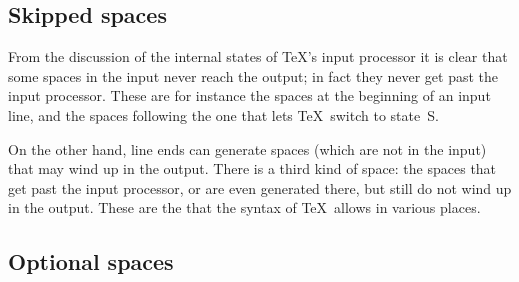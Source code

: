 \documentclass{book}
\begin{document}
\subsection{Skipped spaces}

From the discussion of the internal states of \TeX's 
input processor
it is clear that some spaces in the input never reach the
output; in fact they never get past the input processor.
These are for instance the spaces at the beginning
of an input line, and the spaces following the one
that lets \TeX\ switch to state~{\italic S}.


On the other hand, line ends can generate spaces (which are not
in the input) that may wind up in the output.
There is a third kind of space: the spaces that get past the
input processor,
or are even generated there, but still do not wind up in the
output. These are the  that the 
syntax of \TeX\ allows in various places.

\subsection{Optional spaces}
\end{document}
